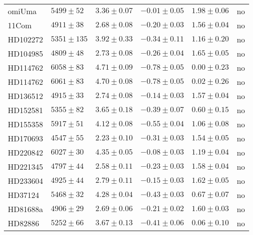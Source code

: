 \documentclass{aa}
\begin{document}
\begin{table*}[htb!]
\begin{tabular}{llllll}
      omiUma      &    $5499 \pm 52 $    &  $3.36 \pm 0.07$    &  $-0.01 \pm 0.05$    &  $1.98 \pm 0.06$             &   no  \\
      11Com       &    $4911 \pm 38 $    &  $2.68 \pm 0.08$    &  $-0.20 \pm 0.03$    &  $1.56 \pm 0.04$             &   no  \\
      HD102272    &    $5351 \pm 135$    &  $3.92 \pm 0.33$    &  $-0.34 \pm 0.11$    &  $1.16 \pm 0.20$             &   no  \\
      HD104985    &    $4809 \pm 48 $    &  $2.73 \pm 0.08$    &  $-0.26 \pm 0.04$    &  $1.65 \pm 0.05$             &   no  \\
      HD114762    &    $6058 \pm 83 $    &  $4.71 \pm 0.09$    &  $-0.78 \pm 0.05$    &  $0.00 \pm 0.23$             &   no  \\
      HD114762    &    $6061 \pm 83 $    &  $4.70 \pm 0.08$    &  $-0.78 \pm 0.05$    &  $0.02 \pm 0.26$             &   no  \\
      HD136512    &    $4915 \pm 33 $    &  $2.74 \pm 0.08$    &  $-0.14 \pm 0.03$    &  $1.57 \pm 0.04$             &   no  \\
      HD152581    &    $5355 \pm 82 $    &  $3.65 \pm 0.18$    &  $-0.39 \pm 0.07$    &  $0.60 \pm 0.15$             &   no  \\
      HD155358    &    $5917 \pm 51 $    &  $4.12 \pm 0.08$    &  $-0.55 \pm 0.04$    &  $1.06 \pm 0.08$             &   no  \\
      HD170693    &    $4547 \pm 55 $    &  $2.23 \pm 0.10$    &  $-0.31 \pm 0.03$    &  $1.54 \pm 0.05$             &   no  \\
      HD220842    &    $6027 \pm 30 $    &  $4.35 \pm 0.05$    &  $-0.08 \pm 0.03$    &  $1.19 \pm 0.04$             &   no  \\
      HD221345    &    $4797 \pm 44 $    &  $2.58 \pm 0.11$    &  $-0.23 \pm 0.03$    &  $1.58 \pm 0.04$             &   no  \\
      HD233604    &    $4925 \pm 44 $    &  $2.79 \pm 0.11$    &  $-0.15 \pm 0.03$    &  $1.62 \pm 0.05$             &   no  \\
      HD37124     &    $5468 \pm 32 $    &  $4.28 \pm 0.04$    &  $-0.43 \pm 0.03$    &  $0.67 \pm 0.07$             &   no  \\
      HD81688a    &    $4906 \pm 29 $    &  $2.69 \pm 0.06$    &  $-0.21 \pm 0.02$    &  $1.60 \pm 0.03$             &   no  \\
      HD82886     &    $5252 \pm 66 $    &  $3.67 \pm 0.13$    &  $-0.41 \pm 0.06$    &  $0.06 \pm 0.10$             &   no  \\

\end{tabular}
\end{table*}
\end{document}
